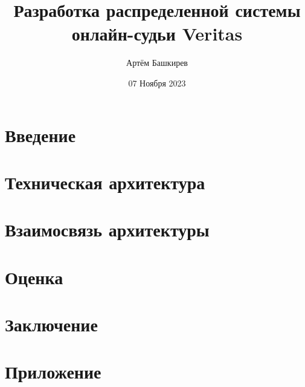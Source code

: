 \documentclass[12pt]{article}
\title{Разработка распределенной системы онлайн-судьи Veritas}
\author{Артём Башкирев}
\date{07 Ноября 2023}
\begin{document}
\maketitle

\newpage
    \tableofcontents
\newpage


    \section{Введение}
    
\newpage

    \section{Техническая архитектура}
    
\newpage

    \section{Взаимосвязь архитектуры}
    
\newpage

    \section{Оценка}
    
\newpage

    \section{Заключение}
    
\newpage

    \section{Приложение}
    
\end{document}
